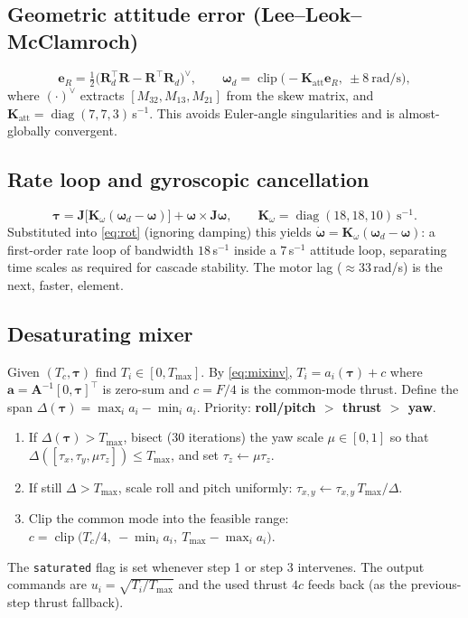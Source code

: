 \documentclass[11pt,a4paper]{article}
\newcommand{\vc}[1]{\bm{#1}}
\newcommand{\code}[1]{\texttt{\small #1}}
\DeclareMathOperator{\clip}{clip}
\DeclareMathOperator{\diag}{diag}
\begin{document}
\subsection{Geometric attitude error (Lee--Leok--McClamroch)}
\begin{equation}
\vc e_R=\tfrac12\bigl(\vc R_d^\top\vc R-\vc R^\top\vc R_d\bigr)^\vee,\qquad
\vc\omega_d=\clip\bigl(-\vc K_{\text{att}}\vc e_R,\ \pm8\ \text{rad/s}\bigr),
\end{equation}
where $(\cdot)^\vee$ extracts $[M_{32},M_{13},M_{21}]$ from the skew matrix, and $\vc K_{\text{att}}=\diag(7,7,3)$\,s$^{-1}$. This avoids Euler-angle singularities and is almost-globally convergent.

\subsection{Rate loop and gyroscopic cancellation}
\begin{equation}
\vc\tau=\vc J\bigl[\vc K_\omega(\vc\omega_d-\vc\omega)\bigr]+\vc\omega\times\vc J\vc\omega,\qquad \vc K_\omega=\diag(18,18,10)\ \text{s}^{-1}.
\end{equation}
Substituted into \eqref{eq:rot} (ignoring damping) this yields $\dot{\vc\omega}=\vc K_\omega(\vc\omega_d-\vc\omega)$: a first-order rate loop of bandwidth $18$\,s$^{-1}$ inside a $7$\,s$^{-1}$ attitude loop, separating time scales as required for cascade stability. The motor lag ($\approx33$\,rad/s) is the next, faster, element.

\subsection{Desaturating mixer}\label{sec:desat}
Given $(T_c,\vc\tau)$ find $T_i\in[0,T_{\max}]$. By \eqref{eq:mixinv}, $T_i=a_i(\vc\tau)+c$ where $\vc a=\vc A^{-1}[0,\vc\tau]^\top$ is zero-sum and $c=F/4$ is the common-mode thrust. Define the span $\Delta(\vc\tau)=\max_ia_i-\min_ia_i$. Priority: \textbf{roll/pitch $>$ thrust $>$ yaw}.
\begin{enumerate}
\item If $\Delta(\vc\tau)>T_{\max}$, bisect (30 iterations) the yaw scale $\mu\in[0,1]$ so that $\Delta([\tau_x,\tau_y,\mu\tau_z])\le T_{\max}$, and set $\tau_z\leftarrow\mu\tau_z$.
\item If still $\Delta>T_{\max}$, scale roll and pitch uniformly: $\tau_{x,y}\leftarrow\tau_{x,y}\,T_{\max}/\Delta$.
\item Clip the common mode into the feasible range: $c=\clip\bigl(T_c/4,\ -\min_ia_i,\ T_{\max}-\max_ia_i\bigr)$.
\end{enumerate}
The \code{saturated} flag is set whenever step 1 or step 3 intervenes. The output commands are $u_i=\sqrt{T_i/T_{\max}}$ and the used thrust $4c$ feeds back (as the previous-step thrust fallback).
\end{document}
